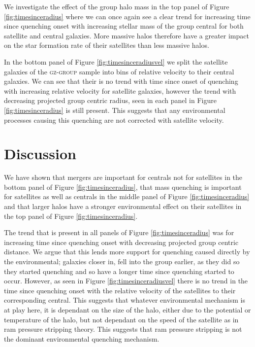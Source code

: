 \documentclass[useAMS,usenatbib]{mn2e}
\begin{document}
We investigate the effect of the group halo mass in the top panel of Figure \ref{fig:timesinceradius} where we can once again see a clear trend for increasing time since quenching onset with increasing stellar mass of the group central for both satellite and central galaxies. More massive halos therefore have a greater impact on the star formation rate of their satellites than less massive halos. 

In the bottom panel of Figure \ref{fig:timesinceradiusvel} we split the satellite galaxies of the \textsc{gz-group} sample into bins of relative velocity to their central galaxies. We can see that their is no trend with time since onset of quenching with increasing relative velocity for satellite galaxies, however the trend with decreasing projected group centric radius, seen in each panel in Figure \ref{fig:timesinceradius} is still present. This suggests that any environmental processes causing this quenching are not corrected with satellite velocity.  

\section{Discussion}\label{sec:disc}

We have shown that mergers are important for centrals not for satellites in the bottom panel of Figure \ref{fig:timesinceradius}, that mass quenching is important for satellites as well as centrals in the middle panel of Figure \ref{fig:timesinceradius} and that larger halos have a stronger environmental effect on their satellites in the top panel of Figure \ref{fig:timesinceradius}. 

The trend that is present in all panels of Figure \ref{fig:timesinceradius} was for increasing time since quenching onset with decreasing projected group centric distance. We argue that this lends more support for quenching caused directly by the environmental; galaxies closer in, fell into the group earlier, as they did so they started quenching and so have a longer time since quenching started to occur. However, as seen in Figure \ref{fig:timesinceradiusvel} there is no trend in the time since quenching onset with the relative velocity of the satellites to their corresponding central. This suggests that whatever environmental mechanism is at play here, it is dependant on the size of the halo, either due to the potential or temperature of the halo, but not dependant on the speed of the satellite as in ram pressure stripping theory. This suggests that ram pressure stripping is not the dominant environmental quenching mechanism. 
\end{document}
